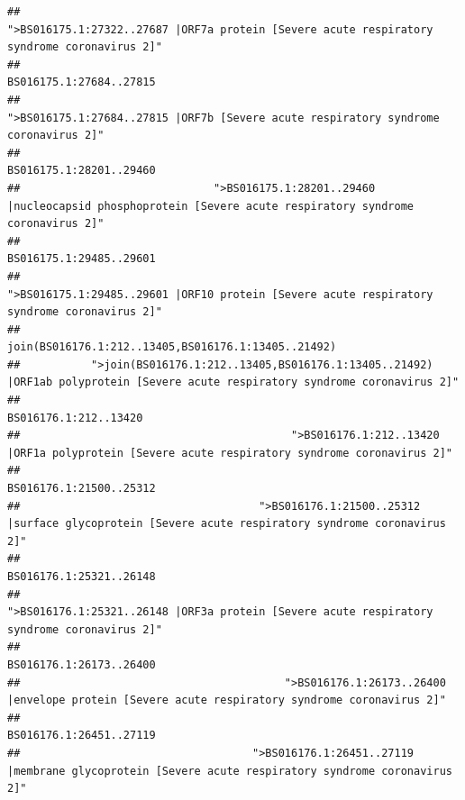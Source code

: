 \documentclass[
]{article}
\begin{document}
\begin{verbatim}
##                                            ">BS016175.1:27322..27687 |ORF7a protein [Severe acute respiratory syndrome coronavirus 2]" 
##                                                                                                                BS016175.1:27684..27815 
##                                                    ">BS016175.1:27684..27815 |ORF7b [Severe acute respiratory syndrome coronavirus 2]" 
##                                                                                                                BS016175.1:28201..29460 
##                              ">BS016175.1:28201..29460 |nucleocapsid phosphoprotein [Severe acute respiratory syndrome coronavirus 2]" 
##                                                                                                                BS016175.1:29485..29601 
##                                            ">BS016175.1:29485..29601 |ORF10 protein [Severe acute respiratory syndrome coronavirus 2]" 
##                                                                                    join(BS016176.1:212..13405,BS016176.1:13405..21492) 
##           ">join(BS016176.1:212..13405,BS016176.1:13405..21492) |ORF1ab polyprotein [Severe acute respiratory syndrome coronavirus 2]" 
##                                                                                                                  BS016176.1:212..13420 
##                                          ">BS016176.1:212..13420 |ORF1a polyprotein [Severe acute respiratory syndrome coronavirus 2]" 
##                                                                                                                BS016176.1:21500..25312 
##                                     ">BS016176.1:21500..25312 |surface glycoprotein [Severe acute respiratory syndrome coronavirus 2]" 
##                                                                                                                BS016176.1:25321..26148 
##                                            ">BS016176.1:25321..26148 |ORF3a protein [Severe acute respiratory syndrome coronavirus 2]" 
##                                                                                                                BS016176.1:26173..26400 
##                                         ">BS016176.1:26173..26400 |envelope protein [Severe acute respiratory syndrome coronavirus 2]" 
##                                                                                                                BS016176.1:26451..27119 
##                                    ">BS016176.1:26451..27119 |membrane glycoprotein [Severe acute respiratory syndrome coronavirus 2]" 

\end{verbatim}
\end{document}
